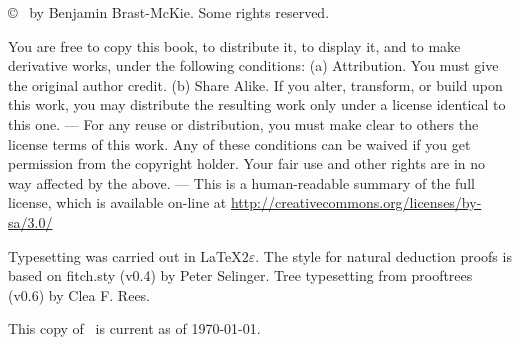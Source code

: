 \strut

\vfill
{
\copyright\  by Benjamin Brast-McKie. Some rights reserved.
}

{\footnotesize
You are free to copy this book, to distribute it, to display it, and to make derivative works, under the following conditions: (a) Attribution. You must give the original author credit. (b) Share Alike. If you alter, transform, or build upon this work, you may distribute the resulting work only under a license identical to this one. --- For any reuse or distribution, you must make clear to others the license terms of this work. Any of these conditions can be waived if you get permission from the copyright holder. Your fair use and other rights are in no way affected by the above. --- This is a human-readable summary of the full license, which is available on-line at \url{http://creativecommons.org/licenses/by-sa/3.0/}

Typesetting was carried out  in \LaTeX$2\varepsilon$.
The style for natural deduction proofs is based on fitch.sty (v0.4) by Peter Selinger. 
Tree typesetting from prooftrees (v0.6) by Clea F. Rees.

This copy of \forallx\ is current as of \today.
}
